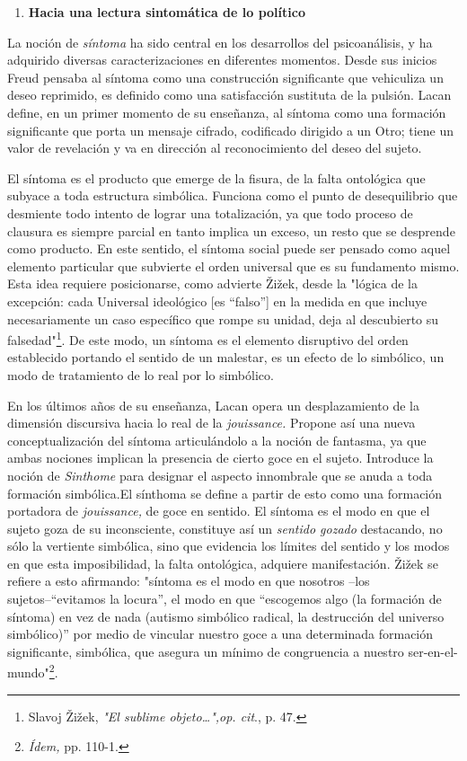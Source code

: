 \documentclass{book}
\begin{document}
\begin{enumerate}
\def\labelenumi{\arabic{enumi}.}
\setcounter{enumi}{4}
\item
  \textbf{Hacia una lectura sintomática de lo político}
\end{enumerate}

La noción de \emph{síntoma} ha sido central en los desarrollos del
psicoanálisis, y ha adquirido diversas caracterizaciones en diferentes
momentos. Desde sus inicios Freud pensaba al síntoma como una
construcción significante que vehiculiza un deseo reprimido, es definido
como una satisfacción sustituta de la pulsión. Lacan define, en un
primer momento de su enseñanza, al síntoma como una formación
significante que porta un mensaje cifrado, codificado dirigido a un
Otro; tiene un valor de revelación y va en dirección al reconocimiento
del deseo del sujeto.

El síntoma es el producto que emerge de la fisura, de la falta
ontológica que subyace a toda estructura simbólica. Funciona como el
punto de desequilibrio que desmiente todo intento de lograr una
totalización, ya que todo proceso de clausura es siempre parcial en
tanto implica un exceso, un resto que se desprende como producto. En
este sentido, el síntoma social puede ser pensado como aquel elemento
particular que subvierte el orden universal que es su fundamento mismo.
Esta idea requiere posicionarse, como advierte Žižek, desde la "lógica
de la excepción: cada Universal ideológico {[}es ``falso''{]} en la
medida en que incluye necesariamente un caso específico que rompe su
unidad, deja al descubierto su falsedad"\footnote{Slavoj Žižek,
  \emph{"El sublime objeto\ldots",op. cit}., p. 47.}. De este modo, un
síntoma es el elemento disruptivo del orden establecido portando el
sentido de un malestar, es un efecto de lo simbólico, un modo de
tratamiento de lo real por lo simbólico.

En los últimos años de su enseñanza, Lacan opera un desplazamiento de la
dimensión discursiva hacia lo real de la \emph{jouissance.} Propone así
una nueva conceptualización del síntoma articulándolo a la noción de
fantasma, ya que ambas nociones implican la presencia de cierto goce en
el sujeto. Introduce la noción de \emph{Sinthome} para designar el
aspecto innombrale que se anuda a toda formación simbólica.El sínthoma
se define a partir de esto como una formación portadora de
\emph{jouissance,} de goce en sentido. El síntoma es el modo en que el
sujeto goza de su inconsciente, constituye así un \emph{sentido gozado}
destacando, no sólo la vertiente simbólica, sino que evidencia los
límites del sentido y los modos en que esta imposibilidad, la falta
ontológica, adquiere manifestación. Žižek se refiere a esto afirmando:
"síntoma es el modo en que nosotros --los sujetos--``evitamos la
locura'', el modo en que ``escogemos algo (la formación de síntoma) en
vez de nada (autismo simbólico radical, la destrucción del universo
simbólico)'' por medio de vincular nuestro goce a una determinada
formación significante, simbólica, que asegura un mínimo de congruencia
a nuestro ser-en-el-mundo"\footnote{\emph{Ídem,} pp. 110-1.}.
\end{document}
